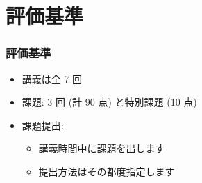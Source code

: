 \section{評価基準}
\begin{frame}
\frametitle{評価基準}
  \begin{itemize}
\item 講義は全 7 回
\item 課題: 3 回 (計 90 点) と特別課題 (10 点)
\item 課題提出: 
    \begin{itemize}
\item 講義時間中に課題を出します
\item 提出方法はその都度指定します
    \end{itemize}
  \end{itemize}
\end{frame}
